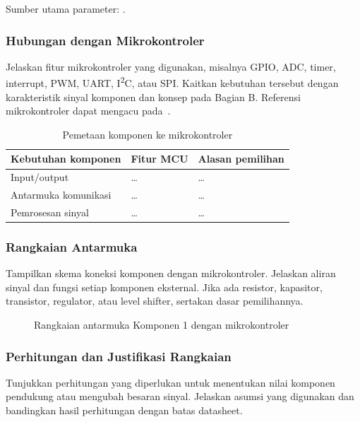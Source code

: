 Sumber utama parameter: \cite{datasheet}.

\subsubsection{Hubungan dengan Mikrokontroler}
Jelaskan fitur mikrokontroler yang digunakan, misalnya GPIO, ADC, timer,
interrupt, PWM, UART, I\textsuperscript{2}C, atau SPI. Kaitkan kebutuhan
tersebut dengan karakteristik sinyal komponen dan konsep pada Bagian B.
Referensi mikrokontroler dapat mengacu pada~\cite{mcu}.

\begin{table}[H]
\centering
\caption{Pemetaan komponen ke mikrokontroler}
\begin{tabularx}{\textwidth}{@{}lXX@{}}
\toprule
Kebutuhan komponen & Fitur MCU & Alasan pemilihan \\
\midrule
Input/output & \dots & \dots \\
Antarmuka komunikasi & \dots & \dots \\
Pemrosesan sinyal & \dots & \dots \\
\bottomrule
\end{tabularx}
\end{table}

\subsubsection{Rangkaian Antarmuka}
Tampilkan skema koneksi komponen dengan mikrokontroler. Jelaskan aliran
sinyal dan fungsi setiap komponen eksternal. Jika ada resistor, kapasitor,
transistor, regulator, atau level shifter, sertakan dasar pemilihannya.

\begin{figure}[H]
\centering
\caption{Rangkaian antarmuka Komponen 1 dengan mikrokontroler}
\label{fig:rangkaian-komponen-01}
\end{figure}

\subsubsection{Perhitungan dan Justifikasi Rangkaian}
Tunjukkan perhitungan yang diperlukan untuk menentukan nilai komponen
pendukung atau mengubah besaran sinyal. Jelaskan asumsi yang digunakan dan
bandingkan hasil perhitungan dengan batas datasheet.

